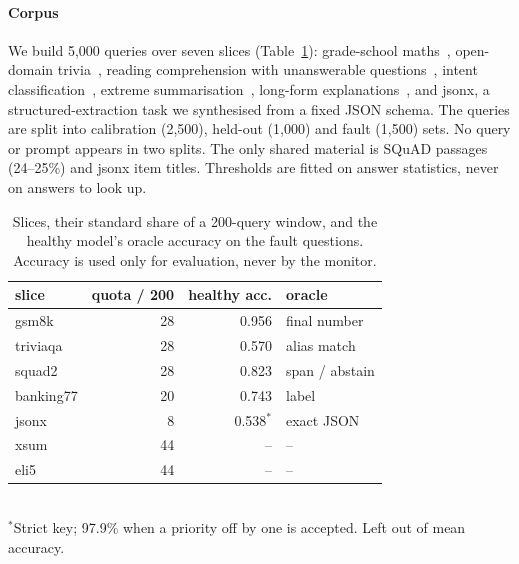 \documentclass{article}
\begin{document}
\paragraph{Corpus}
We build 5{,}000 queries over seven slices (Table~\ref{tab:corpus}): grade-school
maths~\citep{cobbe2021gsm8k}, open-domain trivia~\citep{joshi2017triviaqa},
reading comprehension with unanswerable questions~\citep{rajpurkar2018squad2},
intent classification~\citep{casanueva2020banking77}, extreme
summarisation~\citep{narayan2018xsum}, long-form explanations~\citep{fan2019eli5},
and \textsf{jsonx}, a structured-extraction task we synthesised from a fixed JSON
schema. The queries are split into calibration (2{,}500), held-out (1{,}000) and
fault (1{,}500) sets. No query or prompt appears in two splits. The only shared
material is SQuAD passages (24--25\%) and \textsf{jsonx} item titles. Thresholds
are fitted on answer statistics, never on answers to look up.

\begin{table}[t]
  \centering\small
  \caption{Slices, their standard share of a 200-query window, and the healthy
  model's oracle accuracy on the fault questions. Accuracy is used only for
  evaluation, never by the monitor.}
  \label{tab:corpus}
  \begin{tabular}{lrrl}
    \toprule
    slice & quota / 200 & healthy acc. & oracle \\
    \midrule
    gsm8k & 28 & 0.956 & final number \\
    triviaqa & 28 & 0.570 & alias match \\
    squad2 & 28 & 0.823 & span / abstain \\
    banking77 & 20 & 0.743 & label \\
    jsonx & 8 & 0.538$^\ast$ & exact JSON \\
    xsum & 44 & -- & -- \\
    eli5 & 44 & -- & -- \\
    \bottomrule
  \end{tabular}\\[2pt]
  {\footnotesize $^\ast$Strict key; 97.9\% when a priority off by one is accepted.
  Left out of mean accuracy.}
\end{table}
\end{document}
